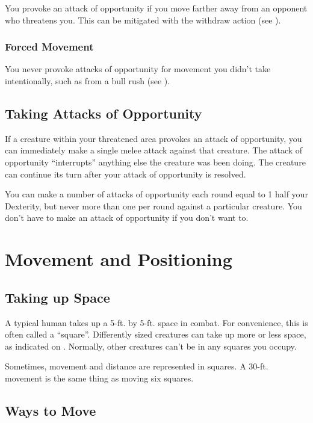  You provoke an attack of opportunity if you move farther away from an opponent who threatens you. This can be mitigated with the withdraw action (see ).

\subsubsection{Forced Movement} You never provoke attacks of opportunity for movement you didn't take intentionally, such as from a bull rush (see ).

\subsection{Taking Attacks of Opportunity}
If a creature within your threatened area provokes an attack of opportunity, you can immediately make a single melee attack against that creature. The attack of opportunity ``interrupts'' anything else the creature was been doing. The creature can continue its turn after your attack of opportunity is resolved.

You can make a number of attacks of opportunity each round equal to 1 \add half your Dexterity, but never more than one per round against a particular creature. You don't have to make an attack of opportunity if you don't want to.

\section{Movement and Positioning}

\subsection{Taking up Space}
A typical human takes up a 5-ft. by 5-ft. space in combat. For convenience, this is often called a ``square''. Differently sized creatures can take up more or less space, as indicated on . Normally, other creatures can't be in any squares you occupy.

Sometimes, movement and distance are represented in squares. A 30-ft. movement is the same thing as moving six squares.

\subsection{Ways to Move}

